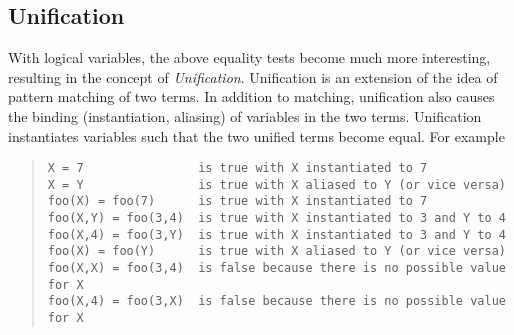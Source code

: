 \subsection{Unification}

   
With logical variables, the above equality tests become much more interesting,
resulting in the concept of {\em Unification}.
Unification is an extension of the idea of pattern matching of two terms.
In addition to matching, unification also causes the binding (instantiation,
aliasing) of variables in the two terms.
Unification instantiates variables such that the two unified terms become
equal. For example
\begin{quote}\begin{verbatim}
X = 7                is true with X instantiated to 7
X = Y                is true with X aliased to Y (or vice versa)
foo(X) = foo(7)      is true with X instantiated to 7
foo(X,Y) = foo(3,4)  is true with X instantiated to 3 and Y to 4
foo(X,4) = foo(3,Y)  is true with X instantiated to 3 and Y to 4
foo(X) = foo(Y)      is true with X aliased to Y (or vice versa)
foo(X,X) = foo(3,4)  is false because there is no possible value for X
foo(X,4) = foo(3,X)  is false because there is no possible value for X
\end{verbatim}\end{quote}








